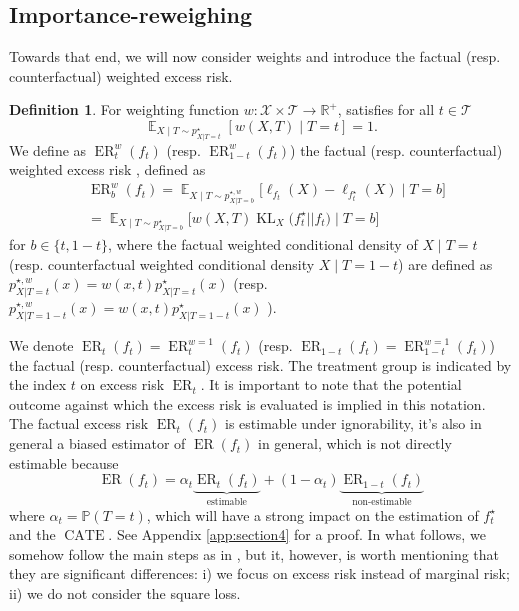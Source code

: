 \documentclass[12pt]{article}
\theoremstyle{plain}
\theoremstyle{definition}
\newtheorem{definition}[theorem]{Definition}
\theoremstyle{remark}
\DeclareMathOperator{\E}{\mathbb{E}}
\DeclareMathOperator{\KL}{\text{KL}}
\DeclareMathOperator{\ER}{\text{ER}}
\DeclareMathOperator{\CATE}{\text{CATE}}
\begin{document}
\subsection{Importance-reweighing}
Towards that end, we will now consider weights and introduce the factual (resp. counterfactual) weighted excess risk. 
\begin{definition}
For weighting function $w : \mathcal{X}\times \mathcal{T} \to \mathbb{R}^{+}$, satisfies for all $t\in\mathcal{T}$
\begin{equation*}
    \E_{X\mid T \sim p^\star_{X | T=t}}[ w(X,T) \mid T=t] =1.
\end{equation*}
We define as $\ER_t^w(f_t)$ (resp. $ \ER_{1-t}^w(f_t)$) the factual (resp. counterfactual) weighted excess risk \cite{Shimodaira2000ImprovingPI}, defined as 
\begin{align*}
     &\ER_b^w(f_t) =  \E_{X\mid T \sim p^{\star,w}_{X | T=b}}\Big[  \ell _{f_{t}}(X) -\ell _{f^{\star}_{t}}( X)\mid T=b\Big] \\
     &=\E_{X\mid T \sim p^\star_{X | T=b}}\Big[ w(X,T)\KL_{X}\Big( f ^{\star}_{t} ||f _{t}\Big)\mid T=b\Big]
\end{align*}
for $ b\in \{ t,1-t\}$, where the factual weighted conditional density of $X \mid T=t$ (resp. counterfactual weighted conditional density $X \mid T=1-t$)  are defined as $ p^{\star,w}_{X | T=t}( x) =w(x,t) p^\star_{X | T=t}(x)$ (resp. $ p^{\star,w}_{X | T=1-t}( x) =w(x,t) p^\star_{X | T=1-t}(x)$ ).
\end{definition}
We denote $ \ER_t(f_t)=\ER_t^{w=1}(f_t)$ (resp. $  \ER_{1-t}(f_t)=\ER_{1-t}^{w=1}(f_t)$) the factual (resp. counterfactual) excess risk. The treatment group is indicated by the index $t$ on excess risk $\ER_t$. It is important to note that the potential outcome against which the excess risk is evaluated is implied in this notation.
The factual excess risk $\ER_t(f_t) $ is estimable under ignorability, it's also in general a biased estimator of $\ER(f_t)$ in general, which is not directly estimable because
\begin{equation}\label{eqn:decomp_ER}
     \ER(f_t) =  \alpha_t\underbrace{  \ER_t(f_t) }_{\text{estimable}}+ (1-\alpha_t)  \underbrace{\ER_{1-t}(f_t)}_{\text{non-estimable}}
\end{equation}
where $\alpha _{t} =\mathbb P ( T=t)$, which will have a strong impact on the estimation of $f_t^\star$ and the $\CATE$. See Appendix \ref{app:section4} for a proof.
In what follows, we somehow follow the main steps as in \cite{johansson2020generalization}, but it, however, is worth mentioning that they are significant differences: 
i) we focus on excess risk instead of marginal risk; ii) we do not consider the square loss. %
\end{document}
